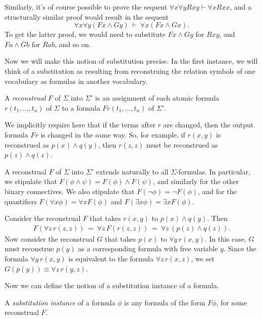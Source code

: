 Similarly, it's of course possible to prove the sequent
$\forall x\forall yRxy\vdash \forall xRxx$, and a structurally similar
proof would result in the sequent
\[ \forall x\forall y(Fx\wedge Gy)\:\vdash\: \forall x(Fx\wedge Gx)
  .\] To get the latter proof, we would need to substitute
$Fx\wedge Gy$ for $Rxy$, and $Fa\wedge Gb$ for $Rab$, and so on.

Now we will make this notion of substitution precise.  In the first
instance, we will think of a substitution as resulting from
reconstruing the relation symbols of one vocabulary as formulas in
another vocabulary.

\begin{defn} A \emph{reconstrual} $F$ of $\Sigma$ into $\Sigma '$ is
  an assignment of each atomic formula $r(t_1,\dots ,t_n)$ of $\Sigma$
  to a formula $Fr(t_1,\dots ,t_n)$ of $\Sigma '$.\end{defn}

We implicitly require here that if the terms after $r$ are changed,
then the output formula $Fr$ is changed in the same way.  So, for
example, if $r(x,y)$ is reconstrued as $p(x)\wedge q(y)$, then
$r(z,z)$ must be reconstrued as $p(z)\wedge q(z)$.

A reconstrual $F$ of $\Sigma$ into $\Sigma '$ extends naturally to all
$\Sigma$-formulas.  In particular, we stipulate that
$F(\phi\wedge\psi )=F(\phi )\wedge F(\psi )$, and similarly for the
other binary connectives.  We also stipulate that
$F(\neg \phi )=\neg F(\phi )$, and for the quantifiers
$F(\forall x\phi )=\forall x F(\phi )$ and
$F(\exists x\phi )=\exists x F(\phi )$.

\begin{example} Consider the reconstrual $F$ that takes $r(x,y)$ to
  $p(x)\wedge q(y)$.  Then
  \[ \begin{array}{lll} F(\forall z\,r(z,z)) \: = \: \forall z\,
      F(r(z,z)) \:= \: \forall z\, (p(z)\wedge q(z)) .\end{array}
  \] %
  Now consider the reconstrual $G$ that takes $p(x)$ to
  $\forall y\, r(x,y)$.  In this case, $G$ must reconstrue $p(y)$ as a
  corresponding formula with free variable $y$.  Since the formula
  $\forall y\, r(x,y)$ is equivalent to the formula
  $\forall z\, r(x,z)$, we set $G(p(y))\equiv \forall z\, r(y,z)$.
\end{example}

Now we can define the notion of a substitution instance of a formula.

 \begin{defn} A \emph{substitution instance} of a formula $\phi$ is
   any formula of the form $F\phi$, for some reconstrual
   $F$. \end{defn}

